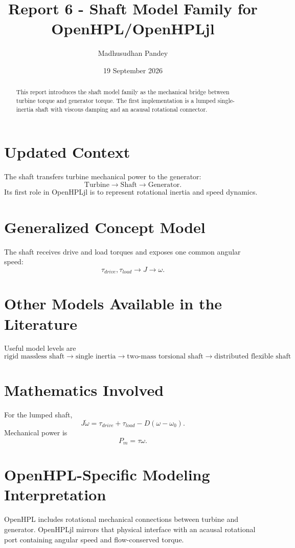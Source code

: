 \documentclass[11pt,a4paper]{article}
\title{Report 6 - Shaft Model Family for OpenHPL/OpenHPLjl}
\author{Madhusudhan Pandey}
\date{19 September 2026}
\begin{document}
\maketitle
\begin{abstract}
This report introduces the shaft model family as the mechanical bridge between turbine torque and generator torque. The first implementation is a lumped single-inertia shaft with viscous damping and an acausal rotational connector.
\end{abstract}
\section{Updated Context}
The shaft transfers turbine mechanical power to the generator:
\[
\boxed{\text{Turbine}\rightarrow\text{Shaft}\rightarrow\text{Generator}}.
\]
Its first role in OpenHPLjl is to represent rotational inertia and speed dynamics.

\section{Generalized Concept Model}
The shaft receives drive and load torques and exposes one common angular speed:
\[
\tau_{drive},\tau_{load}\rightarrow J\rightarrow\omega.
\]

\section{Other Models Available in the Literature}
Useful model levels are
\[
\boxed{\text{rigid massless shaft}\rightarrow\text{single inertia}\rightarrow\text{two-mass torsional shaft}\rightarrow\text{distributed flexible shaft}}.
\]

\section{Mathematics Involved}
For the lumped shaft,
\[
\boxed{J\dot\omega=\tau_{drive}+\tau_{load}-D(\omega-\omega_0)}.
\]
Mechanical power is
\[
P_m=\tau\omega.
\]

\section{OpenHPL-Specific Modeling Interpretation}
OpenHPL includes rotational mechanical connections between turbine and generator. OpenHPLjl mirrors that physical interface with an acausal rotational port containing angular speed and flow-conserved torque.
\end{document}
